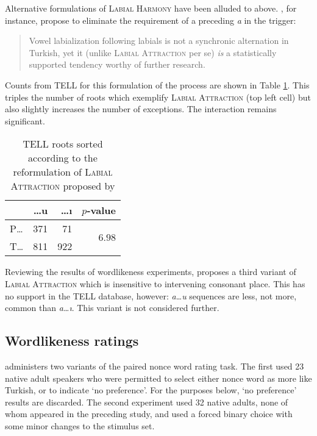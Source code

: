 Alternative formulations of \textsc{Labial Harmony} have been alluded to above. \citeauthor{Inkelas2001}, for instance, propose to eliminate the requirement of a preceding \emph{a} in the trigger:

\begin{quote}
Vowel labialization following labials is not a synchronic alternation in Turkish, yet it (unlike \textsc{Labial Attraction} per se) \emph{is} a statistically supported tendency worthy of further research. \citep[][196]{Inkelas2001}
\end{quote}

\noindent
Counts from TELL for this formulation of the process are shown in Table \ref{lasi}. This triples the number of roots which exemplify \textsc{Labial Attraction} (top left cell) but also slightly increases the number of exceptions. The interaction remains significant.

\begin{table}
\centering
\begin{tabular}{lrrr}
\toprule
       & \ldots{}u  & \ldots{}ı & $p$-value                      \\
\midrule
P\ldots{}  & 371    & 71        & \multirow{2}{*}{$6.98$\e{-49}} \\
T\ldots{}  & 811    & 922       &                                \\
\bottomrule
\end{tabular}
\caption{TELL roots sorted according to the reformulation of \textsc{Labial Attraction} proposed by \citet{Inkelas2001}}
\label{lasi}
\end{table}

Reviewing the results of wordlikeness experiments, \citet{Zimmer1969} proposes a third variant of \textsc{Labial Attraction} which is insensitive to intervening consonant place. This has no support in the TELL database, however: \emph{a\ldots{}u} sequences are less, not more, common than \emph{a\ldots{}ı}. This variant is not considered further.

\subsection{Wordlikeness ratings}

\citet{Zimmer1969} administers two variants of the paired nonce word rating task. The first used 23 native adult speakers who were permitted to select either nonce word as more like Turkish, or to indicate `no preference'. For the purposes below, `no preference' results are discarded. The second experiment used 32 native adults, none of whom appeared in the preceding study, and used a forced binary choice with some minor changes to the stimulus set. 

